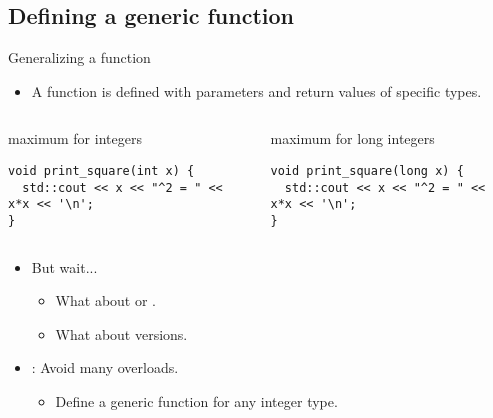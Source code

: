 \subsection{Defining a generic function}

\begin{frame}[t,fragile]{Generalizing a function}
\begin{itemize}
  \item A function is defined with parameters and return
        values of specific types.
\end{itemize}

\begin{columns}[T]

\begin{block}{maximum for integers}
\begin{lstlisting}
void print_square(int x) {
  std::cout << x << "^2 = " << x*x << '\n';
}
\end{lstlisting}
\end{block}

\begin{block}{maximum for long integers}
\begin{lstlisting}
void print_square(long x) {
  std::cout << x << "^2 = " << x*x << '\n';
}
\end{lstlisting}
\end{block}

\end{columns}

\begin{itemize}
  \item But wait...
    \begin{itemize}
      \item What about  or .
      \item What about  versions.
    \end{itemize}

  \item {}: Avoid many overloads.
    \begin{itemize}
      \item Define a generic function for any integer type.
    \end{itemize}
\end{itemize}

\end{frame}

